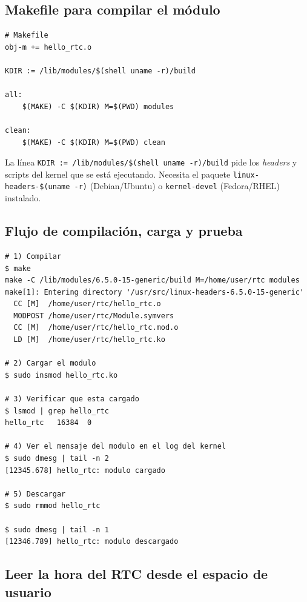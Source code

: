 \documentclass[11pt,a4paper]{article}
\begin{document}
\subsection*{Makefile para compilar el módulo}

\begin{lstlisting}[style=textstyle]
# Makefile
obj-m += hello_rtc.o

KDIR := /lib/modules/$(shell uname -r)/build

all:
	$(MAKE) -C $(KDIR) M=$(PWD) modules

clean:
	$(MAKE) -C $(KDIR) M=$(PWD) clean
\end{lstlisting}

\begin{importante}
La línea \texttt{KDIR := /lib/modules/\$(shell uname -r)/build} pide
los \emph{headers} y scripts del kernel que se está ejecutando.
Necesita el paquete \texttt{linux-headers-\$(uname -r)} (Debian/Ubuntu)
o \texttt{kernel-devel} (Fedora/RHEL) instalado.
\end{importante}

\subsection*{Flujo de compilación, carga y prueba}

\begin{lstlisting}[style=shellstyle]
# 1) Compilar
$ make
make -C /lib/modules/6.5.0-15-generic/build M=/home/user/rtc modules
make[1]: Entering directory '/usr/src/linux-headers-6.5.0-15-generic'
  CC [M]  /home/user/rtc/hello_rtc.o
  MODPOST /home/user/rtc/Module.symvers
  CC [M]  /home/user/rtc/hello_rtc.mod.o
  LD [M]  /home/user/rtc/hello_rtc.ko

# 2) Cargar el modulo
$ sudo insmod hello_rtc.ko

# 3) Verificar que esta cargado
$ lsmod | grep hello_rtc
hello_rtc   16384  0

# 4) Ver el mensaje del modulo en el log del kernel
$ sudo dmesg | tail -n 2
[12345.678] hello_rtc: modulo cargado

# 5) Descargar
$ sudo rmmod hello_rtc

$ sudo dmesg | tail -n 1
[12346.789] hello_rtc: modulo descargado
\end{lstlisting}

\subsection*{Leer la hora del RTC desde el espacio de usuario}
\end{document}
